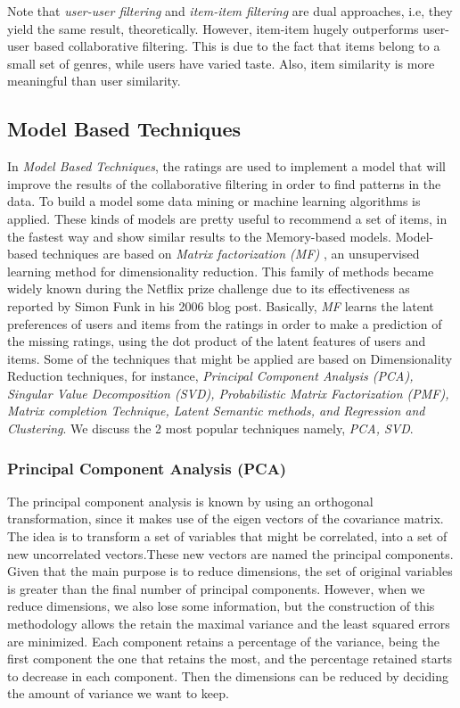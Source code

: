 \documentclass[conference]{IEEEtran}
\begin{document}
Note that \textit{user-user filtering} and \textit{item-item filtering} are dual approaches, i.e, they yield the same result, theoretically. However, item-item hugely outperforms user-user based collaborative filtering. This is due to the fact that items belong to a small set of genres, while users have varied taste. Also, item similarity is more meaningful than user similarity. 

\subsection{Model Based Techniques}
In \textit{Model Based Techniques}, the ratings are used to implement a model that will improve the results of the collaborative filtering in order to find patterns in the data. To build a model some data mining or machine learning algorithms is applied. These kinds of models are pretty useful to recommend a set of items, in the fastest way and show similar results to the Memory-based models. Model-based techniques are based on \textit{Matrix factorization (MF)} \cite{b10}, an unsupervised learning method for dimensionality reduction. This family of methods became widely known during the Netflix prize challenge due to its effectiveness as reported by Simon Funk in his 2006 blog post\cite{b3}. Basically, \textit{MF} learns the latent preferences of users and items from the ratings in order to make a prediction of the missing ratings, using the dot product of the latent features of users and items\cite{b11}.
Some of the techniques that might be applied are based on Dimensionality Reduction techniques, for instance, \textit{Principal Component Analysis (PCA), Singular Value Decomposition (SVD), Probabilistic Matrix Factorization (PMF), Matrix completion Technique, Latent Semantic methods, and Regression and Clustering\cite{b2}}. We discuss the 2 most popular techniques namely, \textit{PCA, SVD}.

\subsubsection{Principal Component Analysis (PCA)}
The principal component analysis is known by using an orthogonal transformation, since it makes use of the eigen vectors of the covariance matrix. The idea is to transform a set of variables that might be correlated, into a set of new uncorrelated vectors.These new vectors are named the principal components.
Given that the main purpose is to reduce dimensions, the set of original variables is greater than the final number of principal components. However, when
 we reduce dimensions, we also lose some information, but the construction of this methodology allows the retain the maximal variance and the least squared errors are minimized. Each component retains a percentage of the variance, being the first component the one that retains the most, and the percentage retained starts to decrease in each component. Then the dimensions can be reduced by deciding the amount of variance we want to keep.
 
\end{document}
